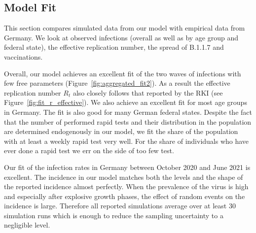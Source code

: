 \subsection{Model Fit}
\label{subsec:fit_results}

This section compares simulated data from our model with empirical data from Germany. We
look at observed infections (overall as well as by age group and federal state), the
effective replication number,  the spread of B.1.1.7 and vaccinations.

Overall, our model achieves an excellent fit of the two waves of infections with few
free parameters (Figure~\ref{fig:aggregated_fit2}). As a result the effective
replication number $R_t$ also closely follows that reported by the RKI (see
Figure~\ref{fig:fit_r_effective}). We also achieve an excellent fit for most age groups
in Germany. The fit is also good for many German federal states. Despite the fact that
the number of performed rapid tests and their distribution in the population are
determined endogenously in our model, we fit the share of the population with at least a
weekly rapid test very well. For the share of individuals who have ever done a rapid
test we err on the side of too few test.

Our fit of the infection rates in Germany between October 2020 and June 2021 is
excellent. The incidence in our model matches both the levels and the shape of the
reported incidence almost perfectly. When the prevalence of the virus is high and
especially after explosive growth phases, the effect of random events on the incidence
is large. Therefore all reported simulations average over at least 30 simulation runs
which is enough to reduce the sampling uncertainty to a negligible level.

